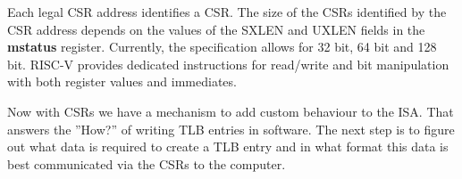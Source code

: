 Each legal CSR address identifies a CSR. The size of the CSRs identified by the CSR address depends
on the values of the SXLEN and UXLEN fields in the \textbf{mstatus} register. Currently, the
specification \cite{RISCVInstructionSet} allows for 32 bit, 64 bit and 128 bit. 
RISC-V provides dedicated instructions for read/write and bit manipulation with both register values
and immediates.

Now with CSRs we have a mechanism to add custom behaviour to the ISA. That answers the ''How?''
of writing TLB entries in software.
The next step is to figure out what data is required to create a TLB entry and in what format
this data is best communicated via the CSRs to the computer.









